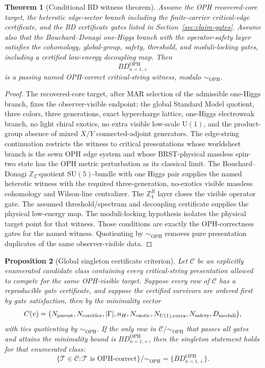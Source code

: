 \documentclass[11pt]{article}
\newtheorem{theorem}{Theorem}[section]
\newtheorem{proposition}[theorem]{Proposition}
\theoremstyle{remark}
\theoremstyle{plain}
\newcommand{\OPH}{\mathrm{OPH}}
\newcommand{\SU}{\mathrm{SU}}
\newcommand{\U}{\mathrm{U}}
\newcommand{\Z}{\mathbb Z}
\newcommand{\ZfourR}{\mathbb Z_4^R}
\newcommand{\Teq}{\sim_{\OPH}}
\begin{document}
\begin{theorem}[Conditional BD witness theorem]
Assume the OPH recovered-core target, the heterotic edge-sector branch including the
finite-carrier critical-edge certificate, and the BD certificate gates listed in
Section~\ref{sec:claim-gates}. Assume also that the Bouchard--Donagi one-Higgs branch with the
operator-safety layer satisfies the cohomology, global-group, safety, threshold, and moduli-locking
gates, including a certified low-energy decoupling map. Then
\[
\boxed{BD_{n=1,+}^{\OPH}}
\]
is a passing named OPH-correct critical-string witness, modulo \(\Teq\).
\end{theorem}

\begin{proof}
The recovered-core target, after MAR selection of the admissible one-Higgs branch, fixes the
observer-visible endpoint: the global Standard Model quotient, three colors, three generations,
exact hypercharge lattice, one-Higgs electroweak branch, no light
chiral exotics, no extra visible low-scale \(\U(1)\), and the product-group absence of mixed
\(X/Y\) connected-adjoint generators. The edge-string continuation restricts the witness to critical presentations
whose worldsheet branch is the sewn OPH edge system and whose BRST-physical massless spin-two state
has the OPH metric perturbation as its classical limit. The Bouchard--Donagi
\(\Z_2\)-quotient \(\SU(5)\)-bundle
with one Higgs pair supplies the named heterotic witness with the required three-generation,
no-exotics visible massless cohomology and Wilson-line centralizer. The \(\ZfourR\) layer closes the visible
operator gate. The assumed threshold/spectrum and decoupling certificate supplies the physical
low-energy map. The moduli-locking hypothesis isolates the physical target point for that witness.
Those conditions are exactly the OPH-correctness gates for the named witness. Quotienting by
\(\Teq\) removes pure presentation duplicates of the same observer-visible data.
\end{proof}

\begin{proposition}[Global singleton certificate criterion]
Let \(\mathcal C\) be an explicitly enumerated candidate class containing every critical-string
presentation allowed to compete for the same OPH-visible target. Suppose every row of
\(\mathcal C\) has a reproducible gate certificate, and suppose the certified survivors are ordered
first by gate satisfaction, then by the minimality vector
\[
C(v)=
\bigl(
N_{\rm parent},N_{\rm corridor},|\Gamma|,n_H,N_{\rm exotic},
N_{U(1),{\rm extra}},N_{\rm safety},D_{\rm moduli}
\bigr),
\]
with ties quotienting by \(\Teq\). If the only row in \(\mathcal C/\Teq\) that passes all gates and
attains the minimality bound is \(BD_{n=1,+}^{\OPH}\), then the singleton statement holds for that
enumerated class:
\[
\boxed{
\{
\mathcal T\in\mathcal C:\mathcal T\text{ is OPH-correct}
\}/\Teq
=
\{BD_{n=1,+}^{\OPH}\}.
}
\]
\end{proposition}
\end{document}
